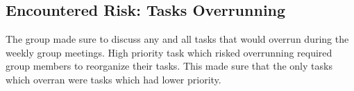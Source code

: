\subsection{Encountered Risk: Tasks Overrunning}
The group made sure to discuss any and all tasks
that would overrun during the weekly group meetings.
High priority task which risked overrunning required
group members to reorganize their tasks. This made sure 
that the only tasks which overran were tasks which had 
lower priority.